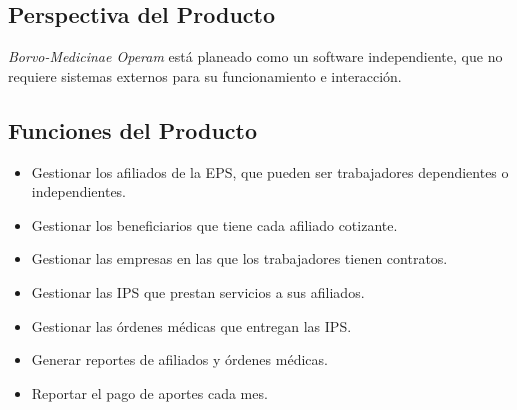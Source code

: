 \documentclass[12pt,a4paper]{article}
\begin{document}
\subsection{Perspectiva del Producto}
\emph{Borvo-Medicinae Operam} está planeado como un software independiente, que no requiere sistemas externos para su funcionamiento e interacción. 
\subsection{Funciones del Producto}
\begin{itemize}
\item Gestionar los afiliados de la EPS, que pueden ser trabajadores dependientes o independientes.
\item Gestionar los beneficiarios que tiene cada afiliado cotizante.
\item Gestionar las empresas en las que los trabajadores tienen contratos.
\item Gestionar las IPS que prestan servicios a sus afiliados.
\item Gestionar las órdenes médicas que entregan las IPS.
\item Generar reportes de afiliados y órdenes médicas.
\item Reportar el pago de aportes cada mes.
\end{itemize}
\end{document}
